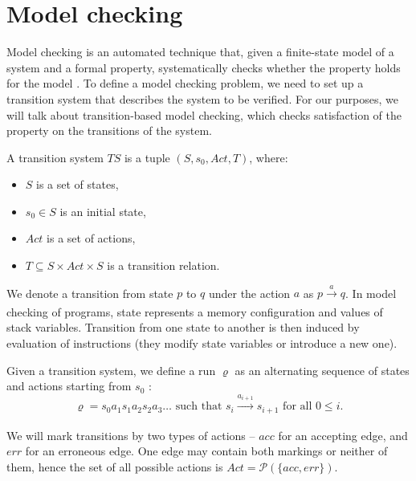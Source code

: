 \section{Model checking} \label{sec:mc}
Model checking is an automated technique that, given a finite-state model of a
system and a formal property, systematically checks whether the property holds
for the model \cite{Baier08}. To define a model checking problem,
we need to set up a transition system that describes the system to be
verified. For our purposes, we will talk about transition-based model checking,
which checks satisfaction of the property on the transitions of the system.

\noindent
\begin{minipage}{\textwidth}
\begin{definition}\label{def:ts}
\medskip
A transition system $TS$ is a tuple $(S, s_0, Act, T)$, where:
\begin{itemize}
    \item $S$ is a set of states,
    \item $s_0 \in S$ is an initial state,
    \item $Act$ is a set of actions,
    \item $T \subseteq S \times Act \times S$ is a
    transition relation.
\end{itemize}
\end{definition}
\end{minipage}
\noindent
We denote a transition from state $p$ to $q$ under the action $a$ as $p
\xrightarrow[]{a} q$. In model checking of \LLVM programs, state represents a
memory configuration and values of stack variables. Transition from one state to
another is then induced by evaluation of \LLVM instructions (they modify state
variables or introduce a new one).

Given a transition system, we define a run $\varrho$ as an alternating
sequence of states and actions starting from $s_0$ \cite{Baier08}:
\[
    \varrho = s_0 a_1 s_1 a_2 s_2 a_3 \dots \text{ such that } s_i
    \xrightarrow[]{a_{i+1}} s_{i+1} \text{ for all } 0 \leq i.
\]

We will mark transitions by two types of actions -- $acc$ for an accepting edge,
and $err$ for an erroneous edge. One edge may contain both markings or neither of
them, hence the set of all possible actions is $Act = \mathcal{P}(\{acc,
err\})$.

